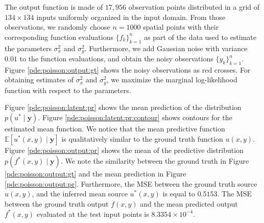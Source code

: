 \documentclass[journal]{IEEEtran}
\newcommand{\simo}[1]{{\color{red}#1}}
\begin{document}
   The output function is made of $17,956$ observation points distributed in a grid of $134\times 134$ inputs uniformly
   organized in the input domain. From those observations, we randomly choose $n=1000$ spatial points with their
   corresponding function evaluations $\{f_k\}_{k=1}^n$ as part of the data used to estimate the parameters $\sigma_x^2$
   and $\sigma_y^2$. Furthermore, we add Gaussian noise with variance $0.01$ to the function evaluations, and obtain the
   noisy observations $\{y_k\}_{k=1}^n$. Figure \ref{pde:poisson:output:gt} shows the noisy observations as red crosses.
   For obtaining estimates of $\sigma_x^2$ and $\sigma_y^2$, we maximize the marginal log-likelihood function with
   respect to the parameters.

Figure \ref{pde:poisson:latent:pr} shows the mean prediction of the distribution $p(u^* \mid \mathbf{y})$. Figure
\ref{pde:poisson:latent:pr:contour} shows contours for the estimated mean function. We notice that the mean predictive
function $\mathbb{E}[u^*(x,y) \mid \mathbf{y}]$ is qualitatively similar to the ground truth function $u(x,y)$. Figure
\ref{pde:poisson:output:pr} shows the mean of the predictive distribution $p(f^*(x,y) \mid \mathbf{y})$. We note the
similarity between the ground truth in Figure \ref{pde:poisson:output:gt} and the mean prediction in Figure
\ref{pde:poisson:output:pr}.  Furthermore, the MSE between the ground truth source $u(x,y)$, and the inferred mean source $u^*(x,y)$
is equal to $0.5153$. The MSE between the ground truth output $f(x,y)$ and the mean predicted output $f^*(x,y)$
evaluated at the test input points is $8.3354\times 10^{-4}$.


%
\end{document}
